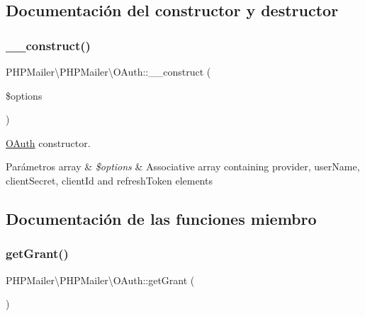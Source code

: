 \subsection{Documentación del constructor y destructor}
\mbox{\label{classPHPMailer_1_1PHPMailer_1_1OAuth_a58d10691ef6d5f8576b302ac11d39756}} 
\subsubsection{\texorpdfstring{\+\_\+\+\_\+construct()}{\_\_construct()}}
{\footnotesize\ttfamily P\+H\+P\+Mailer\textbackslash{}\+P\+H\+P\+Mailer\textbackslash{}\+O\+Auth\+::\+\_\+\+\_\+construct (\begin{DoxyParamCaption}\item[{}]{\$options }\end{DoxyParamCaption})}

\hyperlink{classPHPMailer_1_1PHPMailer_1_1OAuth}{O\+Auth} constructor.


\begin{DoxyParams}[1]{Parámetros}
array & {\em \$options} & Associative array containing {\ttfamily provider}, {\ttfamily user\+Name}, {\ttfamily client\+Secret}, {\ttfamily client\+Id} and {\ttfamily refresh\+Token} elements \\
\hline
\end{DoxyParams}


\subsection{Documentación de las funciones miembro}
\mbox{\label{classPHPMailer_1_1PHPMailer_1_1OAuth_a489d6e6f54e346e72b628be10863fd24}} 
\subsubsection{\texorpdfstring{get\+Grant()}{getGrant()}}
{\footnotesize\ttfamily P\+H\+P\+Mailer\textbackslash{}\+P\+H\+P\+Mailer\textbackslash{}\+O\+Auth\+::get\+Grant (\begin{DoxyParamCaption}{ }\end{DoxyParamCaption})\hspace{0.3cm}{\ttfamily [protected]}}

